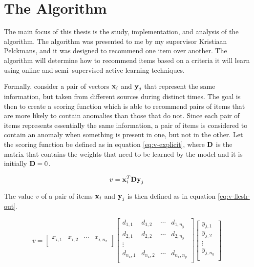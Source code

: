 \section{The \mlblink Algorithm} \label{sect:theory:ml-blink}

The main focus of this thesis is the study, implementation, and analysis of the \mlblink algorithm. The \mlblink algorithm was presented to me by my supervisor Kristiaan Pelckmans, and it was designed to recommend one item over another. The \mlblink algorithm will determine how to recommend items based on a criteria it will learn using online and semi--supervised active learning techniques.  \newline

Formally, consider a pair of vectors $\boldsymbol{\mathbf{x}}_i$ and $\boldsymbol{\mathbf{y}}_j$ that represent the same information, but taken from different sources during distinct times. The goal is then to create a scoring function which is able to recommend pairs of items that are more likely to contain anomalies than those that do not. Since each pair of items represents essentially the same information, a pair of items is considered to contain an anomaly when something is present in one, but not in the other. Let the scoring function be defined as in equation \ref{eq:v-explicit}, where $\boldsymbol{\mathbf{D}}$ is the matrix that contains the weights that need to be learned by the model and it is initially $\boldsymbol{\mathbf{D}} = 0$.

\begin{equation} \label{eq:v-explicit}
  v = \boldsymbol{\mathbf{x}}_{i}^{T} \boldsymbol{\mathbf{D}} \boldsymbol{\mathbf{y}}_j  
\end{equation}

The value $v$ of a pair of items $\boldsymbol{\mathbf{x}}_i$ and $\boldsymbol{\mathbf{y}}_j$ is then defined as in equation \ref{eq:v-flesh-out}.

\begin{equation} \label{eq:v-flesh-out}
    v = 
    \begin{bmatrix}
        x_{i,1} & x_{i,2} & \cdots & x_{i,n_x} \\
    \end{bmatrix}
    \begin{bmatrix}
        d_{1,1} & d_{1,2} & \cdots & d_{1,n_y} \\
        d_{2,1} & d_{2,2} & \cdots & d_{2,n_y} \\
        \vdots \\
        d_{n_x,1} & d_{n_x,2} & \cdots & d_{n_x,n_y} \\
    \end{bmatrix}
    \begin{bmatrix}
        y_{j,1} \\
        y_{j,2} \\
        \vdots  \\
        y_{j,n_y} \\
    \end{bmatrix}
\end{equation}


